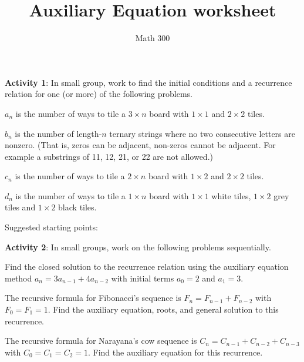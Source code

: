 \documentclass[11pt]{amsart}
\title{Auxiliary Equation worksheet}
\author{Math 300}
\newenvironment{packed_enum}{
\begin{enumerate}
  \setlength{\itemsep}{1pt}
  \setlength{\parskip}{0pt}
  \setlength{\parsep}{0pt}
}{\end{enumerate}}
\begin{document}
\maketitle


{\bf Activity 1}:  In small group, work to find the initial conditions and a recurrence relation for one (or more) of the following problems.

\begin{packed_enum}
\item $a_n$ is the number of ways to tile a $3 \times n$ board with $1 \times 1$ and $ 2\times 2$ tiles. 
\item $b_n$ is the number of length-$n$ ternary strings where no two consecutive letters are nonzero. (That is, zeros can be adjacent, non-zeros cannot be adjacent.  For example a substrings of 11, 12, 21, or 22 are not allowed.)
\item $c_n$ is the number of ways to tile a $2 \times n$ board with $1 \times 2$ and $ 2\times 2$ tiles.
\item $d_n$ is the number of ways to tile a $1 \times n$ board with $1 \times 1$  white tiles, $ 1\times 2$ grey tiles and $ 1\times 2$ black tiles.
\end{packed_enum}

Suggested starting points: 

\pagebreak

{\bf Activity 2}:  In small groups, work on the following problems sequentially.
\begin{packed_enum}

\item Find the closed solution to the recurrence relation using the auxiliary equation method $a_n=3a_{n-1}+4a_{n-2}$
with initial terms $a_0=2$ and $a_1=3$.
\item The recursive formula for Fibonacci's sequence is $F_n=F_{n-1}+F_{n-2}$ with $F_0=F_1=1$.  Find the auxiliary equation, roots, and general solution to this recurrence.
\item The recursive formula for Narayana's cow sequence is $C_n=C_{n-1}+C_{n-2}+C_{n-3}$ with $C_0=C_1=C_2=1$.  Find the auxiliary equation for this recurrence.

\end{packed_enum}
\end{document}
